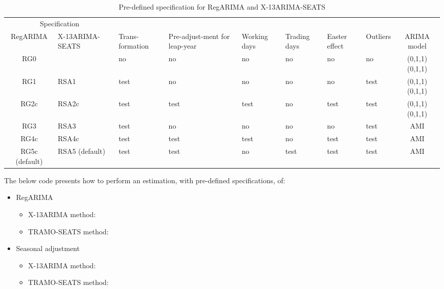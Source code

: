 \documentclass[article]{jss}
\providecommand{\tightlist}{%
  \setlength{\itemsep}{0pt}\setlength{\parskip}{0pt}}
\begin{document}
\begin{table}[t]

\caption{\label{tab:pre_def_x13}Pre-defined specification for RegARIMA and X-13ARIMA-SEATS}
\centering
\fontsize{7}{9}\selectfont
\begin{tabular}{c>{\centering\arraybackslash}p{1.7cm}>{\centering\arraybackslash}p{}>{\centering\arraybackslash}p{1.4cm}>{\centering\arraybackslash}p{0.9cm}>{\centering\arraybackslash}p{0.9cm}>{\centering\arraybackslash}p{0.9cm}>{\centering\arraybackslash}p{0.9cm}c}
\toprule
\multicolumn{2}{c}{Specification} & \multicolumn{1}{c}{} \\
\cmidrule(l{3pt}r{3pt}){1-2}
RegARIMA & X-13ARIMA-SEATS & Trans-formation & Pre-adjust-ment for leap-year & Working days & Trading days & Easter effect & Outliers & ARIMA model\\
\midrule
RG0 &  & no & no & no & no & no & no & (0,1,1)(0,1,1)\\
RG1 & RSA1 & test & no & no & no & no & test & (0,1,1)(0,1,1)\\
RG2c & RSA2c & test & test & test & no & test & test & (0,1,1)(0,1,1)\\
RG3 & RSA3 & test & no & no & no & no & test & AMI\\
RG4c & RSA4c & test & test & test & no & test & test & AMI\\
\addlinespace
RG5c (default) & RSA5 (default) & test & test & no & test & test & test & AMI\\
\bottomrule
\end{tabular}
\end{table}

The below code presents how to perform an estimation, with pre-defined
specifications, of:

\begin{itemize}
\tightlist
\item
  RegARIMA

  \begin{itemize}
  \tightlist
  \item
    X-13ARIMA method:
  \item
    TRAMO-SEATS method:
  \end{itemize}
\item
  Seasonal adjustment

  \begin{itemize}
  \tightlist
  \item
    X-13ARIMA method:
  \item
    TRAMO-SEATS method:
  \end{itemize}
\end{itemize}
\end{document}
